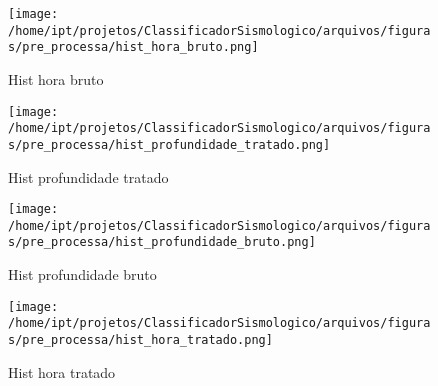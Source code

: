 
    \begin{figure}[H]
        \centering
        \texttt{[image: /home/ipt/projetos/ClassificadorSismologico/arquivos/figuras/pre\_processa/hist\_hora\_bruto.png]}
        \caption{Hist hora bruto}
        \label{fig:hist_hora_bruto}
    \end{figure}
                

    \begin{figure}[H]
        \centering
        \texttt{[image: /home/ipt/projetos/ClassificadorSismologico/arquivos/figuras/pre\_processa/hist\_profundidade\_tratado.png]}
        \caption{Hist profundidade tratado}
        \label{fig:hist_profundidade_tratado}
    \end{figure}
                

    \begin{figure}[H]
        \centering
        \texttt{[image: /home/ipt/projetos/ClassificadorSismologico/arquivos/figuras/pre\_processa/hist\_profundidade\_bruto.png]}
        \caption{Hist profundidade bruto}
        \label{fig:hist_profundidade_bruto}
    \end{figure}
                

    \begin{figure}[H]
        \centering
        \texttt{[image: /home/ipt/projetos/ClassificadorSismologico/arquivos/figuras/pre\_processa/hist\_hora\_tratado.png]}
        \caption{Hist hora tratado}
        \label{fig:hist_hora_tratado}
    \end{figure}
                